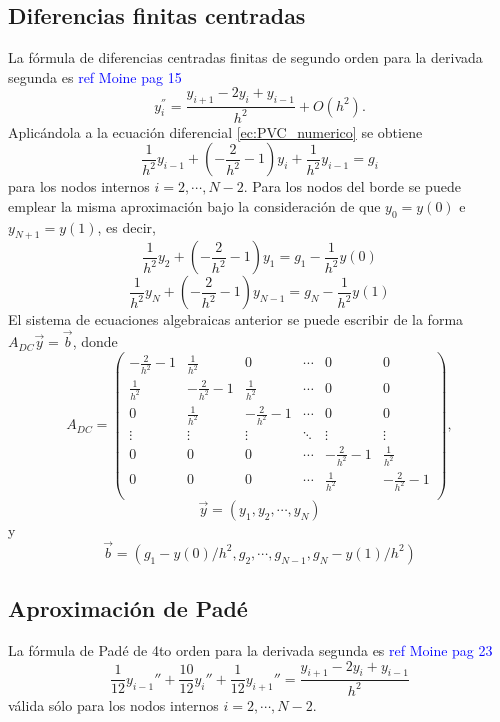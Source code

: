 \documentclass[aps,prb,twocolumn,superscriptaddress,floatfix,longbibliography]{revtex4-2}
\newif\ifptitle
\newif\ifpnumber
\newcounter{para}
\newcommand\ptitle[1]{\par\refstepcounter{para}
{\ifpnumber{\noindent\textcolor{lightgray}{\textbf{\thepara}}\indent}\fi}
{\ifptitle{\textbf{[{#1}]}}\fi}}
\begin{document}
\subsection{Diferencias finitas centradas}
La fórmula de diferencias centradas finitas de segundo orden para la derivada segunda es \textcolor{blue}{ref Moine pag 15}
\begin{equation}
    y_i^{''} = \frac{y_{i+1} - 2 y_i + y_{i-1}}{h^2} + O(h^2).
    \label{ec:diferencias_centradas}
\end{equation}
Aplicándola a la ecuación diferencial \ref{ec:PVC_numerico} se obtiene
\[ \frac{1}{h^2} y_{i-1} + \left (-\frac{2}{h^2} - 1 \right ) y_i + \frac{1}{h^2} y_{i-1} = g_i\]
para los nodos internos $i = 2, \cdots, N-2$. Para los nodos del borde se puede emplear la misma aproximación bajo la consideración de que $y_0 = y(0)$ e $y_{N+1} = y(1)$, es decir,
\[\frac{1}{h^2}y_2 + \left (-\frac{2}{h^2} - 1 \right ) y_1 = g_1 - \frac{1}{h^2}y(0)  \]
\[\frac{1}{h^2}y_N + \left (-\frac{2}{h^2} - 1 \right ) y_{N-1} = g_N - \frac{1}{h^2}y(1)  \]
El sistema de ecuaciones algebraicas anterior se puede escribir de la forma $A_{DC} \vec{y} = \vec{b}$, donde
\[
    A_{DC} = \left(\begin{matrix}
        -\frac{2}{h^2} - 1 & \frac{1}{h^2} & 0 & \cdots & 0 & 0\\
        \frac{1}{h^2} & -\frac{2}{h^2} - 1 & \frac{1}{h^2} & \cdots & 0 & 0\\
        0 & \frac{1}{h^2} & -\frac{2}{h^2} - 1 & \cdots & 0 & 0\\
        \vdots & \vdots & \vdots & \ddots & \vdots & \vdots\\
        0 & 0 & 0 & \cdots & -\frac{2}{h^2} - 1 & \frac{1}{h^2}\\
        0 & 0 & 0 & \cdots & \frac{1}{h^2} & -\frac{2}{h^2} - 1\\
        \end{matrix}\right),
\]
\[\vec{y} = (y_1, y_2, \cdots, y_N)\]
y
\[\vec{b} = (g_1 - y(0)/h^2, g_2, \cdots, g_{N-1}, g_N -  y(1)/h^2)\]


\subsection{Aproximación de Padé}

\ptitle{Obtención del sistema lineal en los nodos internos}
La fórmula de Padé de 4to orden para la derivada segunda es \textcolor{blue}{ref Moine pag 23}
\begin{equation}
    \frac{1}{12} y_{i-1}'' + \frac{10}{12} y_i'' + \frac{1}{12} y_{i+1}'' = \frac{y_{i+1} - 2 y_i + y_{i-1}}{h^2}
    \label{ec:Pade_interior}
\end{equation}
válida sólo para los nodos internos $i = 2, \cdots, N-2$.
\end{document}
